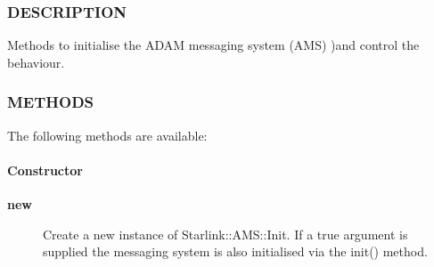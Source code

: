 \subsubsection*{DESCRIPTION\label{ORAC::Msg::Control::AMS_DESCRIPTION}}

Methods to initialise the ADAM messaging system (AMS) )and control the
behaviour.

\subsubsection*{METHODS\label{ORAC::Msg::Control::AMS_METHODS}}

The following methods are available:

\paragraph*{Constructor\label{ORAC::Msg::Control::AMS_Constructor}}\begin{description}
\item[\textbf{new}] \mbox{}

Create a new instance of Starlink::AMS::Init.
If a true argument is supplied the messaging system is also
initialised via the init() method.

\end{description}
